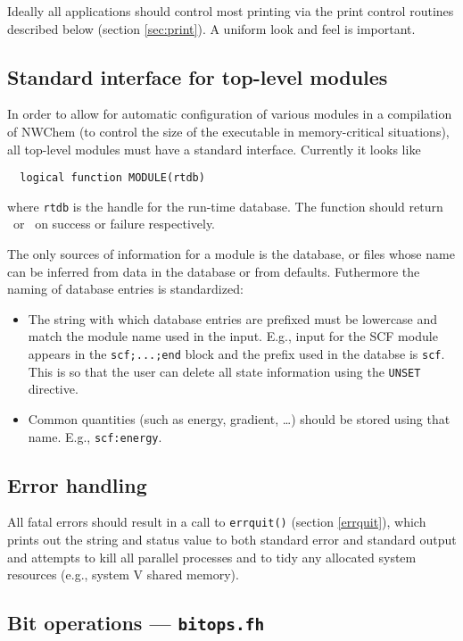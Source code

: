 Ideally all applications should control most printing via the print
control routines described below (section \ref{sec:print}).  A uniform
look and feel is important.


\subsection{Standard interface for top-level modules}

In order to allow for automatic configuration of various modules in
a compilation of NWChem (to control the size of the executable
in memory-critical situations), all top-level modules must have a
standard interface.  Currently it looks like
\begin{verbatim}
  logical function MODULE(rtdb)
\end{verbatim}
where \verb+rtdb+ is the handle for the run-time database.  The
function should return \TRUE\ or \FALSE\ on success or failure
respectively.

The only sources of information for a module is the database, or files
whose name can be inferred from data in the database or from defaults.
Futhermore the naming of database entries is standardized:
\begin{itemize}
\item The string with which database entries are prefixed must be
  lowercase and match the module name used in the input.  E.g., input
  for the SCF module appears in the \verb+scf;...;end+ block and the
  prefix used in the databse is \verb+scf+.  This is so that the user
  can delete all state information using the \verb+UNSET+ directive.
\item Common quantities (such as energy, gradient, \ldots) should be
  stored using that name.  E.g., \verb+scf:energy+.
\end{itemize}


\subsection{Error handling}

All fatal errors should result in a call to \verb+errquit()+ (section
\ref{errquit}), which prints out the string and status value to both
standard error and standard output and attempts to kill all parallel
processes and to tidy any allocated system resources (e.g., system V
shared memory).

\subsection{Bit operations --- {\tt bitops.fh}}

